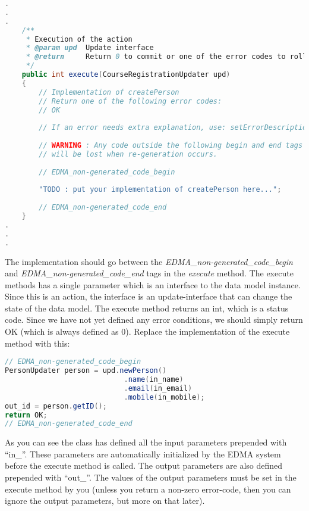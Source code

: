 \begin{lstlisting}[basicstyle={\scriptsize},language=Java,tabsize=2]
.
.
.
    /**
     * Execution of the action
     * @param upd  Update interface
     * @return     Return 0 to commit or one of the error codes to roll back
     */
    public int execute(CourseRegistrationUpdater upd)
    {
        // Implementation of createPerson
        // Return one of the following error codes:
        // OK
        
        // If an error needs extra explanation, use: setErrorDescription("Extra info");
        
        // WARNING : Any code outside the following begin and end tags
        // will be lost when re-generation occurs.
        
        // EDMA_non-generated_code_begin
        
        "TODO : put your implementation of createPerson here...";
        
        // EDMA_non-generated_code_end
    }
.
.
.
\end{lstlisting}


The implementation should go between the \emph{EDMA\_non-generated\_code\_begin}
and \emph{EDMA\_non-generated\_code\_end} tags in the \emph{execute}
method. The execute methods has a single parameter which is an interface
to the data model instance. Since this is an action, the interface
is an update-interface that can change the state of the data model.
The execute method returns an int, which is a status code. Since we
have not yet defined any error conditions, we should simply return
OK (which is always defined as 0). Replace the implementation of the
execute method with this:

\begin{lstlisting}[basicstyle={\scriptsize},language=Java,tabsize=2]
// EDMA_non-generated_code_begin
PersonUpdater person = upd.newPerson()
							.name(in_name)
							.email(in_email)
							.mobile(in_mobile);
out_id = person.getID();
return OK;
// EDMA_non-generated_code_end
\end{lstlisting}


As you can see the class has defined all the input parameters prepended
with ``in\_''. These parameters are automatically initialized by
the EDMA system before the execute method is called. The output parameters
are also defined prepended with ``out\_''. The values of the output
parameters must be set in the execute method by you (unless you return
a non-zero error-code, then you can ignore the output parameters,
but more on that later).

